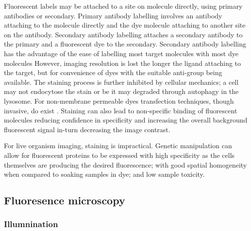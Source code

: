 Fluorescent labels may be attached to a site on molecule directly, using primary antibodies or secondary.
Primary antibody labelling involves an antibody attaching to the molecule directly and the dye molecule attaching to another site on the antibody.
Secondary antibody labelling attaches a secondary antibody to the primary and a fluorescent dye to the secondary.
Secondary antibody labelling has the advantage of the ease of labelling most target molecules with most dye molecules
However, imaging resolution is lost the longer the ligand attaching to the target, but for convenience of dyes with the suitable anti-group being available.
The staining process is further inhibited by cellular mechanics; a cell may not endocytose the stain or be it may degraded through autophagy in the lysosome.
For non-membrane permeable dyes transfection techniques, though invasive, do exist \cite{}.
Staining can also lead to non-specific binding of fluorescent molecules reducing confidence in specificity and increasing the overall background fluorescent signal in-turn decreasing the image contrast.

For live organism imaging, staining is impractical.
Genetic manipulation can allow for fluorescent proteins to be expressed with high specificity as the cells themselves are producing the desired fluorescence; with good spatial homogeneity when compared to soaking samples in dye; and low sample toxicity.


\subsection{Fluoresence microscopy}

\subsubsection{Illumnination}

